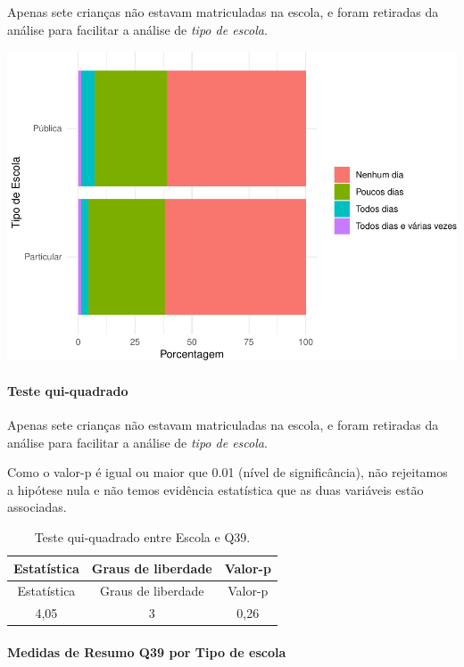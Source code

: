 \documentclass[]{article}
\let\oldparagraph\paragraph
\renewcommand{\paragraph}[1]{\oldparagraph{#1}\mbox{}}
\begin{document}
Apenas sete crianças não estavam matriculadas na escola, e foram retiradas da análise para facilitar a análise de \emph{tipo de escola}.

\begin{center}\includegraphics[width=0.75\linewidth]{relatorio_covid19_files/figure-latex/unnamed-chunk-1529-1} \end{center}

\hypertarget{teste-qui-quadrado-131}{%
\paragraph{Teste qui-quadrado}\label{teste-qui-quadrado-131}}

Apenas sete crianças não estavam matriculadas na escola, e foram retiradas da análise para facilitar a análise de \emph{tipo de escola}.

Como o valor-p é igual ou maior que 0.01 (nível de significância), não rejeitamos a hipótese nula e não temos evidência estatística que as duas variáveis estão associadas.

\begin{longtable}[]{@{}ccc@{}}
\caption{\label{tab:unnamed-chunk-1531}Teste qui-quadrado entre Escola e Q39.}\tabularnewline
\toprule
Estatística & Graus de liberdade & Valor-p\tabularnewline
\midrule
\endfirsthead
\toprule
Estatística & Graus de liberdade & Valor-p\tabularnewline
\midrule
\endhead
4,05 & 3 & 0,26\tabularnewline
\bottomrule
\end{longtable}

\cleardoublepage

\hypertarget{medidas-de-resumo-q39-por-tipo-de-escola}{%
\paragraph{Medidas de Resumo Q39 por Tipo de escola}\label{medidas-de-resumo-q39-por-tipo-de-escola}}
\end{document}
